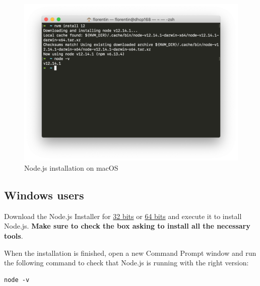 \documentclass{article}
\begin{document}
\begin{figure}
	\centering
	\includegraphics[width=0.7\linewidth]{assets/nvm.png}
	\caption{Node.js installation on macOS}
	\label{fig:nvm}
\end{figure}

\subsection{Windows users}

Download the Node.js Installer for \href{https://nodejs.org/dist/v12.14.1/node-v12.14.1-x86.msi}{32 bits} or \href{https://nodejs.org/dist/v12.14.1/node-v12.14.1-x64.msi}{64 bits} and execute it to install Node.js. \textbf{Make sure to check the box asking to install all the necessary tools}.

\noindent When the installation is finished, open a new Command Prompt window and run the following command to check that Node.js is running with the right version:

\begin{Verbatim}
node -v
\end{Verbatim}
\end{document}
